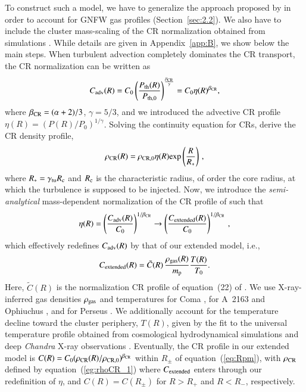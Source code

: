 \documentclass[useAMS,usenatbib]{mn2e}
\begin{document}
To construct such a model, we have to generalize the approach proposed by
\citet{2011A&A...527A..99E} in order to account for GNFW gas profiles
(Section~\ref{sec:2.2}). We also have to include the cluster mass-scaling of the
CR normalization obtained from simulations \citep{2010MNRAS.409..449P}. While
details are given in Appendix~\ref{app:B}, we show below the main steps. When
turbulent advection completely dominates the CR transport, the CR normalization
can be written as \citep{2011A&A...527A..99E}
\begin{equation}
C_{{\mathrm{adv}}}(R)=C_{0} \left( \frac{P_{{\mathrm{th}}}(R)}{P_{{\mathrm{th}},0}} \right)^{\frac{\beta_{{\mathrm{CR}}}}{\gamma}} = 
C_{0} \eta(R)^{\beta_{{\mathrm{CR}}}},
\label{eq:Csimple_1}
\end{equation} 
where $\beta_{{\mathrm{CR}}}=(\alpha+2)/3$, $\gamma=5/3$, and we introduced the
advective CR profile $\eta(R)=(P(R)/P_0)^{1/\gamma}$. Solving the continuity
equation for CRs, \citet{2011A&A...527A..99E} derive the CR density profile,
\begin{equation}
\rho_{{\mathrm{CR}}}(R) = \rho_{{\mathrm{CR}},0} \eta(R) {\mathrm{exp}} \left( \frac{R}{R_{*}} \right) \, ,
\label{eg:rhoCR_1}
\end{equation} 
where $R_{*}=\gamma_{{\mathrm{{\mathrm{tu}}}}}R_{{\mathrm{c}}}$ and $R_{{\mathrm{c}}}$ is the characteristic 
radius, of order the core radius, at which the turbulence is supposed to be injected.
Now, we introduce the \emph{semi-analytical} mass-dependent normalization of the
CR profile of \cite{2010MNRAS.409..449P} such that
\begin{equation}
\eta(R) = \left( \frac{C_{{\mathrm{adv}}}(R)}{C_0} \right)^{1/\beta_{{\mathrm{CR}}}} \to
\left( \frac{C_{{\mathrm{extended}}}(R)}{C_0} \right)^{1/\beta_{{\mathrm{CR}}}} \, ,
\label{eq:eta}
\end{equation} 
which effectively redefines $C_{{\mathrm{adv}}}(R)$ by that of our extended model, i.e.,
\begin{equation}
C_{{\mathrm{extended}}}(R) =  \tilde{C}(R)\, \frac{\rho_{{\mathrm{gas}}}(R)}{m_{\mathrm{p}}} \frac{T(R)}{T_0}.
\label{eq:Cf}
\end{equation} 
Here, $\tilde{C}(R)$ is the normalization CR profile of equation~(22) of
\cite{2010MNRAS.409..449P}. We use X-ray-inferred gas densities
$\rho_{{\mathrm{gas}}}$ and temperatures for Coma \citep{1992A&A...259L..31B}, for
A~2163 and Ophiuchus \citep{2002ApJ...567..716R}, and for Perseus
\citep{2003ApJ...590..225C}. We additionally account for the temperature
decline toward the cluster periphery, $T(R)$, given by the fit to the universal
temperature profile obtained from cosmological hydrodynamical simulations
\citep{2007MNRAS.378..385P,2010MNRAS.409..449P} and deep {\em Chandra} X-ray
observations \citep{2005ApJ...628..655V}. Eventually, the CR profile in our
extended model is $C(R)=C_{0}(\rho_{{\mathrm{CR}}}(R) /
\rho_{{\mathrm{CR}},0})^{\beta_{{\mathrm{CR}}}}$ within $R_{\pm}$ of
equation~(\ref{eq:Rpm}), with $\rho_{{\mathrm{CR}}}$ defined by
equation~(\ref{eg:rhoCR_1}) where $C_{{\mathrm{extended}}}$ enters through our
redefinition of $\eta$, and $C(R) = C(R_{\pm})$ for $R > R_{+}$ and $R < R_{-}$,
respectively.
\end{document}
